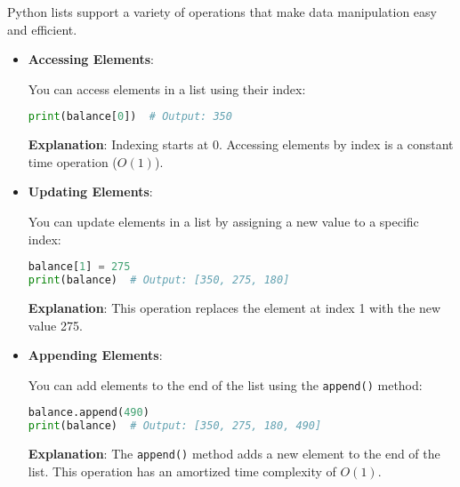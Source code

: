 Python lists support a variety of operations that make data manipulation easy and efficient.

\begin{itemize}
    \item \textbf{Accessing Elements}:

    You can access elements in a list using their index:

    \begin{fullwidth}
    \begin{lstlisting}[language=Python, caption=Accessing elements in a list]
print(balance[0])  # Output: 350
    \end{lstlisting}
    \end{fullwidth}

    \textbf{Explanation}: Indexing starts at 0. Accessing elements by index is a constant time operation (\(O(1)\)).

    \item \textbf{Updating Elements}:

    You can update elements in a list by assigning a new value to a specific index:

    \begin{fullwidth}
    \begin{lstlisting}[language=Python, caption=Updating elements in a list]
balance[1] = 275
print(balance)  # Output: [350, 275, 180]
    \end{lstlisting}
    \end{fullwidth}

    \textbf{Explanation}: This operation replaces the element at index 1 with the new value 275.

    \item \textbf{Appending Elements}:

    You can add elements to the end of the list using the \texttt{append()} method:

    \begin{fullwidth}
    \begin{lstlisting}[language=Python, caption=Appending elements to a list]
balance.append(490)
print(balance)  # Output: [350, 275, 180, 490]
    \end{lstlisting}
    \end{fullwidth}

    \textbf{Explanation}: The \texttt{append()} method adds a new element to the end of the list. This operation has an amortized time complexity of \(O(1)\).


\end{itemize}
